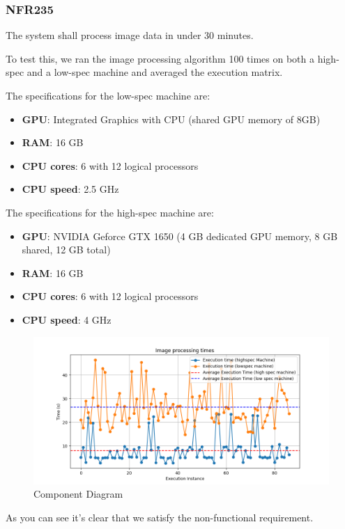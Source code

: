 \documentclass[12pt, titlepage]{article}
\begin{document}
\subsubsection{NFR235}
The system shall process image data in under 30 minutes.

To test this, we ran the image processing algorithm 100 times on both a high-spec and a low-spec machine and averaged the execution matrix.

The specifications for the low-spec machine are:
\begin{itemize}
\item \textbf{GPU}: Integrated Graphics with CPU (shared GPU memory of 8GB)
\item \textbf{RAM}: 16 GB
\item \textbf{CPU cores}: 6 with 12 logical processors
\item \textbf{CPU speed}: 2.5 GHz

\end{itemize}
The specifications for the high-spec machine are:
\begin{itemize}
\item \textbf{GPU}:  NVIDIA Geforce GTX 1650 (4 GB dedicated GPU memory, 8 GB shared, 12 GB total)
\item \textbf{RAM}: 16 GB
\item \textbf{CPU cores}: 6 with 12 logical processors
\item \textbf{CPU speed}: 4 GHz
\end{itemize}


\begin{figure}[H]
    \includegraphics[width=\linewidth]{./imgs/cleanAlgTimes.png}
    \caption{Component Diagram}
    \label{fig: High level component diagram}
\end{figure}

As you can see it's clear that we satisfy the non-functional requirement.
\end{document}
